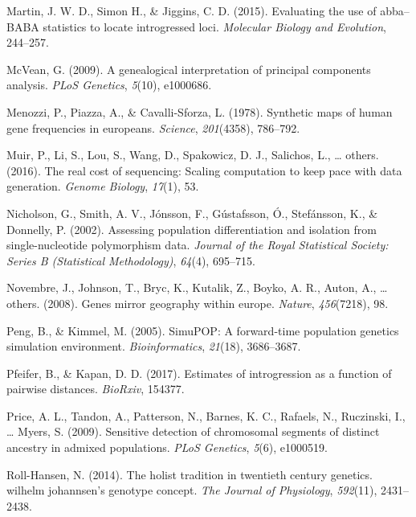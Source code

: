 \documentclass[12pt,a4paper,twoside]{ugathesis}
\theoremstyle{definition}
\theoremstyle{definition}
\theoremstyle{remark}
\begin{document}
\hypertarget{ref-martin2000}{}
Martin, J. W. D., Simon H., \& Jiggins, C. D. (2015). Evaluating the use
of abba--BABA statistics to locate introgressed loci. \emph{Molecular
Biology and Evolution}, 244--257.

\hypertarget{ref-mcvean2009genealogical}{}
McVean, G. (2009). A genealogical interpretation of principal components
analysis. \emph{PLoS Genetics}, \emph{5}(10), e1000686.

\hypertarget{ref-menozzi1978synthetic}{}
Menozzi, P., Piazza, A., \& Cavalli-Sforza, L. (1978). Synthetic maps of
human gene frequencies in europeans. \emph{Science}, \emph{201}(4358),
786--792.

\hypertarget{ref-muir2016real}{}
Muir, P., Li, S., Lou, S., Wang, D., Spakowicz, D. J., Salichos, L.,
\ldots{} others. (2016). The real cost of sequencing: Scaling
computation to keep pace with data generation. \emph{Genome Biology},
\emph{17}(1), 53.

\hypertarget{ref-nicholson2002assessing}{}
Nicholson, G., Smith, A. V., Jónsson, F., Gústafsson, Ó., Stefánsson,
K., \& Donnelly, P. (2002). Assessing population differentiation and
isolation from single-nucleotide polymorphism data. \emph{Journal of the
Royal Statistical Society: Series B (Statistical Methodology)},
\emph{64}(4), 695--715.

\hypertarget{ref-novembre2008genes}{}
Novembre, J., Johnson, T., Bryc, K., Kutalik, Z., Boyko, A. R., Auton,
A., \ldots{} others. (2008). Genes mirror geography within europe.
\emph{Nature}, \emph{456}(7218), 98.

\hypertarget{ref-peng2005simupop}{}
Peng, B., \& Kimmel, M. (2005). SimuPOP: A forward-time population
genetics simulation environment. \emph{Bioinformatics}, \emph{21}(18),
3686--3687.

\hypertarget{ref-pfeifer2017estimates}{}
Pfeifer, B., \& Kapan, D. D. (2017). Estimates of introgression as a
function of pairwise distances. \emph{BioRxiv}, 154377.

\hypertarget{ref-price2009sensitive}{}
Price, A. L., Tandon, A., Patterson, N., Barnes, K. C., Rafaels, N.,
Ruczinski, I., \ldots{} Myers, S. (2009). Sensitive detection of
chromosomal segments of distinct ancestry in admixed populations.
\emph{PLoS Genetics}, \emph{5}(6), e1000519.

\hypertarget{ref-roll2014holist}{}
Roll-Hansen, N. (2014). The holist tradition in twentieth century
genetics. wilhelm johannsen's genotype concept. \emph{The Journal of
Physiology}, \emph{592}(11), 2431--2438.
\end{document}

